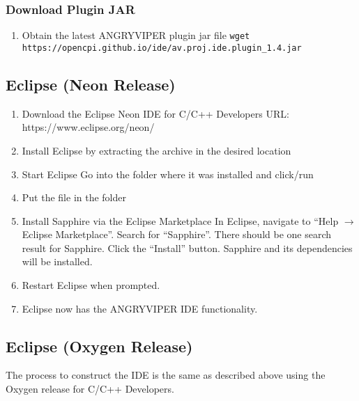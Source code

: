 \begin{appendices}
\subsubsection*{Download Plugin JAR}
\begin{enumerate}
\item Obtain the latest ANGRYVIPER plugin jar file
\subitem \verb+wget https://opencpi.github.io/ide/av.proj.ide.plugin_1.4.jar+
\end{enumerate}

\subsection{Eclipse (Neon Release)}
\begin{enumerate}
\item Download the Eclipse Neon IDE for C/C++ Developers
\subitem URL: https://www.eclipse.org/neon/
\item Install Eclipse by extracting the archive in the desired location
\item Start Eclipse
\subitem Go into the folder where it was installed and click/run 
\item Put the  file in the  folder
\item Install Sapphire via the Eclipse Marketplace
\subitem In Eclipse, navigate to ``Help $\rightarrow$ Eclipse Marketplace''. Search for ``Sapphire''. There should be one search result for Sapphire.
Click the ``Install'' button.  Sapphire and its dependencies will be installed.
\item Restart Eclipse when prompted.
\item Eclipse now has the ANGRYVIPER IDE functionality.
\end{enumerate}

\subsection{Eclipse (Oxygen Release)}
The process to construct the IDE is the same as described above using the Oxygen release for C/C++ Developers. \\


\end{appendices}

